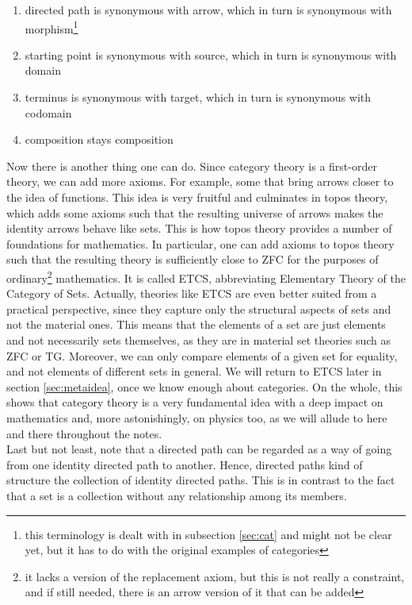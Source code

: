 \begin{enumerate}
\item[(1)]
directed path is synonymous with arrow, which in turn is synonymous with morphism\footnote{this terminology is dealt with in subsection \ref{sec:cat} and might not be clear yet, but it has to do with the original examples of categories}
\item[(2)]
starting point is synonymous with source, which in turn is synonymous with domain
\item[(3)]
terminus is synonymous with target, which in turn is synonymous with codomain
\item[(4)]
composition stays composition
\end{enumerate}
Now there is another thing one can do.
Since category theory is a first-order theory, we can add more axioms.
For example, some that bring arrows closer to the idea of functions.
This idea is very fruitful and culminates in topos theory, which adds some axioms such that the resulting universe of arrows makes the identity arrows behave like sets.
This is how topos theory provides a number of foundations for mathematics.
In particular, one can add axioms to topos theory such that the resulting theory is sufficiently close to ZFC for the purposes of ordinary\footnote{it lacks a version of the replacement axiom, but this is not really a constraint, and if still needed, there is an arrow version of it that can be added} mathematics.
It is called ETCS, abbreviating {\glqq}Elementary Theory of the Category of Sets{\grqq}.
Actually, theories like ETCS are even better suited from a practical perspective, since they capture only the structural aspects of sets and not the material ones.
This means that the elements of a set are just elements and not necessarily sets themselves, as they are in material set theories such as ZFC or TG.
Moreover, we can only compare elements of a given set for equality, and not elements of different sets in general.
We will return to ETCS later in section \ref{sec:metaidea}, once we know enough about categories.
On the whole, this shows that category theory is a very fundamental idea with a deep impact on mathematics and, more astonishingly, on physics too, as we will allude to here and there throughout the notes.
\\
Last but not least, note that a directed path can be regarded as a way of going from one identity directed path to another.
Hence, directed paths kind of structure the collection of identity directed paths.
This is in contrast to the fact that a set is a collection without any relationship among its members.
